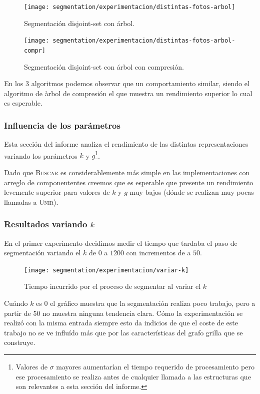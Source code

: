 \begin{figure}[H]
	\centering
	\texttt{[image: segmentation/experimentacion/distintas-fotos-arbol]}
	\caption{Segmentación disjoint-set con árbol.}
\end{figure}

\begin{figure}[H]
	\centering
	\texttt{[image: segmentation/experimentacion/distintas-fotos-arbol-compr]}
	\caption{Segmentación disjoint-set con árbol con compresión.}
\end{figure}

En los 3 algoritmos podemos observar que un comportamiento similar, siendo el algoritmo de àrbol de compresión el que muestra un rendimiento superior lo cual es esperable.

\subsubsection{Influencia de los parámetros}

Esta sección del informe analiza el rendimiento de las distintas
representaciones variando los parámetros $k$ y $g$\footnote{Valores de $\sigma$
mayores aumentarían el tiempo requerido de procesamiento pero ese procesamiento
se realiza antes de cualquier llamada a las estructuras que son relevantes a
esta sección del informe.}.

Dado que \textsc{Buscar} es considerablemente más simple en las
implementaciones con arreglo de componententes creemos que es esperable que
presente un rendimiento levemente superior para valores de $k$ y $g$ muy bajos
(dónde se realizan muy pocas llamadas a \textsc{Unir}).

\subsubsection{Resultados variando $k$}

En el primer experimento decidimos medir el tiempo que tardaba el paso de
segmentación variando el $k$ de $0$ a $1200$ con incrementos de a $50$.

\begin{figure}[h]
	\centering
	\texttt{[image: segmentation/experimentacion/variar-k]}
	\caption{Tiempo incurrido por el proceso de segmentar al variar el $k$}
\end{figure}

Cuándo $k$ es $0$ el gráfico muestra que la segmentación realiza poco trabajo,
pero a partir de $50$ no muestra ninguna tendencia clara. Cómo la
experimentación se realizó con la misma entrada siempre esto da indicios de que
el coste de este trabajo no se ve influído más que por las características del
grafo grilla que se construye.

